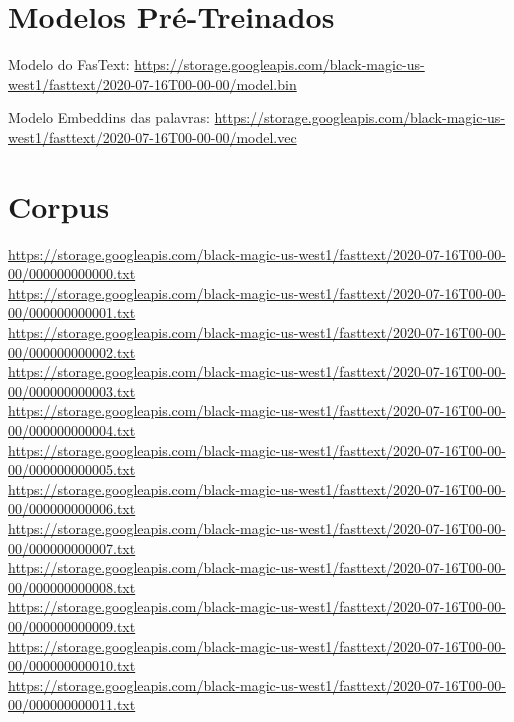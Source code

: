\begin{apendicesenv}
\section{Modelos Pré-Treinados}

Modelo do FasText: \url{https://storage.googleapis.com/black-magic-us-west1/fasttext/2020-07-16T00-00-00/model.bin}

Modelo Embeddins das palavras: \url{https://storage.googleapis.com/black-magic-us-west1/fasttext/2020-07-16T00-00-00/model.vec}

\section{Corpus}

\begin{simpletext}\small
\url{https://storage.googleapis.com/black-magic-us-west1/fasttext/2020-07-16T00-00-00/000000000000.txt} \\
\url{https://storage.googleapis.com/black-magic-us-west1/fasttext/2020-07-16T00-00-00/000000000001.txt} \\
\url{https://storage.googleapis.com/black-magic-us-west1/fasttext/2020-07-16T00-00-00/000000000002.txt} \\
\url{https://storage.googleapis.com/black-magic-us-west1/fasttext/2020-07-16T00-00-00/000000000003.txt} \\
\url{https://storage.googleapis.com/black-magic-us-west1/fasttext/2020-07-16T00-00-00/000000000004.txt} \\
\url{https://storage.googleapis.com/black-magic-us-west1/fasttext/2020-07-16T00-00-00/000000000005.txt} \\
\url{https://storage.googleapis.com/black-magic-us-west1/fasttext/2020-07-16T00-00-00/000000000006.txt} \\
\url{https://storage.googleapis.com/black-magic-us-west1/fasttext/2020-07-16T00-00-00/000000000007.txt} \\
\url{https://storage.googleapis.com/black-magic-us-west1/fasttext/2020-07-16T00-00-00/000000000008.txt} \\
\url{https://storage.googleapis.com/black-magic-us-west1/fasttext/2020-07-16T00-00-00/000000000009.txt} \\
\url{https://storage.googleapis.com/black-magic-us-west1/fasttext/2020-07-16T00-00-00/000000000010.txt} \\
\url{https://storage.googleapis.com/black-magic-us-west1/fasttext/2020-07-16T00-00-00/000000000011.txt} \\

\end{simpletext}
\end{apendicesenv}
